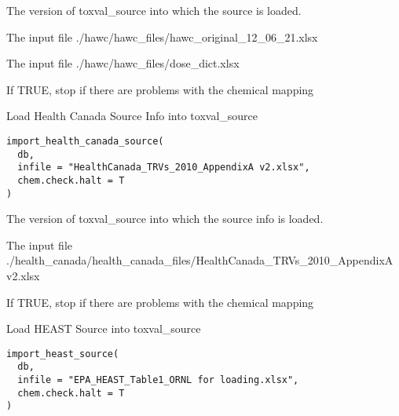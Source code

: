 \documentclass[letterpaper]{book}
\begin{document}
%
\begin{Arguments}
\begin{ldescription}
\item[\code{db}] The version of toxval\_source into which the source is loaded.

\item[\code{infile1}] The input file ./hawc/hawc\_files/hawc\_original\_12\_06\_21.xlsx

\item[\code{infile2}] The input file ./hawc/hawc\_files/dose\_dict.xlsx

\item[\code{chem.check.halt}] If TRUE, stop if there are problems with the chemical mapping
\end{ldescription}
\end{Arguments}
%
\begin{Description}\relax
Load Health Canada Source Info into toxval\_source
\end{Description}
%
\begin{Usage}
\begin{verbatim}
import_health_canada_source(
  db,
  infile = "HealthCanada_TRVs_2010_AppendixA v2.xlsx",
  chem.check.halt = T
)
\end{verbatim}
\end{Usage}
%
\begin{Arguments}
\begin{ldescription}
\item[\code{db}] The version of toxval\_source into which the source info is loaded.

\item[\code{infile}] The input file ./health\_canada/health\_canada\_files/HealthCanada\_TRVs\_2010\_AppendixA v2.xlsx

\item[\code{chem.check.halt}] If TRUE, stop if there are problems with the chemical mapping
\end{ldescription}
\end{Arguments}
%
\begin{Description}\relax
Load HEAST Source into toxval\_source
\end{Description}
%
\begin{Usage}
\begin{verbatim}
import_heast_source(
  db,
  infile = "EPA_HEAST_Table1_ORNL for loading.xlsx",
  chem.check.halt = T
)
\end{verbatim}
\end{Usage}
\end{document}
